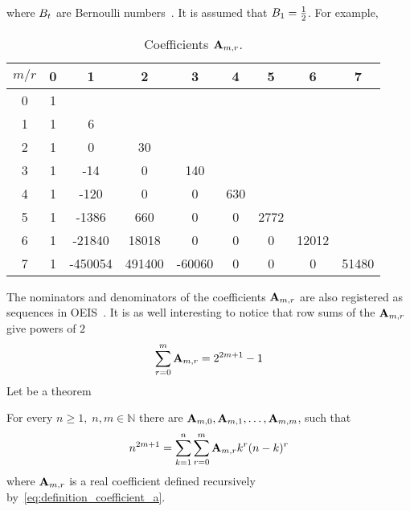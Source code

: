 where ${B}\sb{t}$ are Bernoulli numbers~\cite{bateman1953higher}.
It is assumed that ${B}\sb{1}=\frac{1}{2}$.
For example,
\begin{table}[H]
    \begin{center}
        \setlength\extrarowheight{-6pt}
        \begin{tabular}{c|cccccccc}
            $m/r$ & 0 & 1       & 2      & 3      & 4   & 5    & 6     & 7 \\ [3px]
            \hline
            0     & 1 &         &        &        &     &      &       &       \\
            1     & 1 & 6       &        &        &     &      &       &       \\
            2     & 1 & 0       & 30     &        &     &      &       &       \\
            3     & 1 & -14     & 0      & 140    &     &      &       &       \\
            4     & 1 & -120    & 0      & 0      & 630 &      &       &       \\
            5     & 1 & -1386   & 660    & 0      & 0   & 2772 &       &       \\
            6     & 1 & -21840  & 18018  & 0      & 0   & 0    & 12012 &       \\
            7     & 1 & -450054 & 491400 & -60060 & 0   & 0    & 0     & 51480
        \end{tabular}
    \end{center}
    \caption{Coefficients ${\mathbf{A}} \sb{m,r}$.}
    \label{tab:table_of_coefficients_a}
\end{table}
The nominators and denominators of the coefficients ${\mathbf{A}} \sb{m,r}$ are also registered as sequences
in OEIS~\cite{kolosov2018numerator,kolosov2018denominator}.
It is as well interesting to notice that row sums of the ${\mathbf{A}} \sb{m,r}$ give powers of $2$
\begin{equation*}
    \sum_{r=0}^{m} {\mathbf{A}} \sb{m,r} = 2^{2m+1} - 1
\end{equation*}
Let be a theorem
\begin{thm}
    For every $n\geq 1, \; n,m\in\mathbb{N}$ there are ${\mathbf{A}} \sb{m,0}, {\mathbf{A}} \sb{m,1},\dots,{\mathbf{A}} \sb{m,m}$,
    such that
    \begin{equation*}
        n^{2m+1} = \sum_{k=1}^{n}\sum_{r=0}^{m} {\mathbf{A}} \sb{m,r} k^r (n-k)^r
        \label{eq:odd-power-theorem}
    \end{equation*}
    where ${\mathbf{A}} \sb{m,r}$ is a real coefficient defined recursively by~\eqref{eq:definition_coefficient_a}.
\end{thm}
